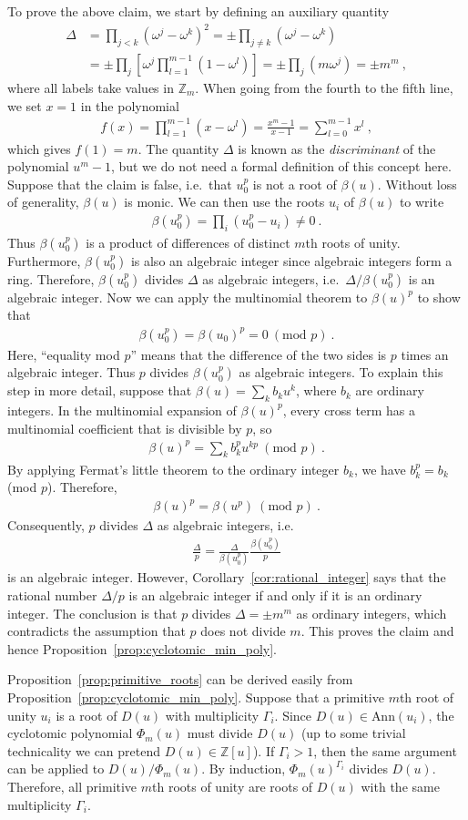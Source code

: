 \documentclass[aps,prb,twocolumn,superscriptaddress,floatfix,10pt,nofootinbib]{revtex4-2}
\newcommand{\ie}{\begin{equation}\begin{aligned}}
\newcommand{\fe}{\end{aligned}\end{equation}}
\theoremstyle{definition}
\begin{document}
To prove the above claim, we start by defining an auxiliary quantity
\ie
\Delta&=\prod_{j<k}\left(\omega^j-\omega^k\right)^2=\pm\prod_{j\neq k}\left(\omega^j-\omega^k\right)\\
&=\pm\prod_j\left[\omega^j\prod_{l=1}^{m-1}\left(1-\omega^l\right)\right]=\pm\prod_j\left(m\omega^j\right)=\pm m^m~,
\fe
where all labels take values in $\mathbb{Z}_m$. When going from the fourth to the fifth line, we set $x=1$ in the polynomial
\ie
f(x)=\prod_{l=1}^{m-1}\left(x-\omega^l\right)=\frac{x^m-1}{x-1}=\sum_{l=0}^{m-1}x^l~,
\fe
which gives $f(1)=m$. The quantity $\Delta$ is known as the \textit{discriminant} of the polynomial $u^m-1$, but we do not need a formal definition of this concept here. Suppose that the claim is false, i.e.\ that $u_0^p$ is not a root of $\beta(u)$. Without loss of generality, $\beta(u)$ is monic. We can then use the roots $u_i$ of $\beta(u)$ to write
\ie
\beta(u_0^p)=\prod_i (u_0^p-u_i)\neq0~.
\fe
Thus $\beta(u_0^p)$ is a product of differences of distinct $m$th roots of unity. Furthermore, $\beta(u_0^p)$ is also an algebraic integer since algebraic integers form a ring. Therefore, $\beta(u_0^p)$ divides $\Delta$ as algebraic integers, i.e.\ $\Delta/\beta(u_0^p)$ is an algebraic integer. Now we can apply the multinomial theorem to $\beta(u)^p$ to show that
\ie
\beta(u_0^p)=\beta(u_0)^p=0\ (\text{mod }p)~.
\fe
Here, ``equality mod $p$'' means that the difference of the two sides is $p$ times an algebraic integer. Thus $p$ divides $\beta(u_0^p)$ as algebraic integers. To explain this step in more detail, suppose that $\beta(u)=\sum_kb_ku^k$, where $b_k$ are ordinary integers. In the multinomial expansion of $\beta(u)^p$, every cross term has a multinomial coefficient that is divisible by $p$, so
\ie
\beta(u)^p=\sum_k b_k^p u^{kp}\ (\text{mod }p)~.
\fe
By applying Fermat's little theorem to the ordinary integer $b_k$, we have $b_k^p=b_k$ (mod $p$). Therefore,
\ie
\beta(u)^p=\beta(u^p)\ (\text{mod }p)~.
\fe
Consequently, $p$ divides $\Delta$ as algebraic integers, i.e.
\ie
\frac{\Delta}{p}=\frac{\Delta}{\beta(u_0^p)}\frac{\beta(u_0^p)}{p}
\fe
is an algebraic integer. However, Corollary~\ref{cor:rational_integer} says that the rational number $\Delta/p$ is an algebraic integer if and only if it is an ordinary integer. The conclusion is that $p$ divides $\Delta=\pm m^m$ as ordinary integers, which contradicts the assumption that $p$ does not divide $m$. This proves the claim and hence Proposition~\ref{prop:cyclotomic_min_poly}.

Proposition~\ref{prop:primitive_roots} can be derived easily from Proposition~\ref{prop:cyclotomic_min_poly}. Suppose that a primitive $m$th root of unity $u_i$ is a root of $D(u)$ with multiplicity $\Gamma_i$. Since $D(u)\in\text{Ann}(u_i)$, the cyclotomic polynomial $\Phi_m(u)$ must divide $D(u)$ (up to some trivial technicality we can pretend $D(u)\in\mathbb{Z}[u]$). If $\Gamma_i>1$, then the same argument can be applied to $D(u)/\Phi_m(u)$. By induction, $\Phi_m(u)^{\Gamma_i}$ divides $D(u)$. Therefore, all primitive $m$th roots of unity are roots of $D(u)$ with the same multiplicity $\Gamma_i$.
\end{document}
